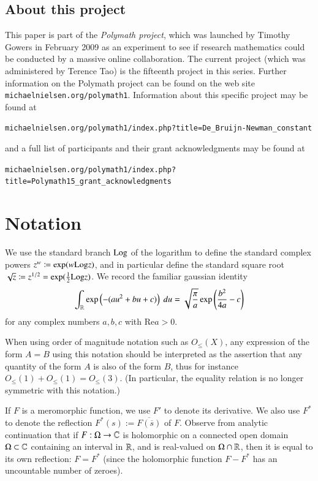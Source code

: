 \subsection{About this project}

This paper is part of the \emph{Polymath project}, which was launched
by Timothy Gowers in February 2009 as an experiment to see if research
mathematics could be conducted by a massive online collaboration.
The current project (which was administered by Terence Tao) is the fifteenth
project in this series.  Further information on the Polymath project can be
found on the web site {\tt michaelnielsen.org/polymath1}.  Information
about this specific project may be found at
\begin{center}
\small{{\tt michaelnielsen.org/polymath1/index.php?title=De\_Bruijn-Newman\_constant}}
\end{center}
and a full list of participants and their grant acknowledgments may be
found at
\begin{center}
\small{{\tt michaelnielsen.org/polymath1/index.php?title=Polymath15\_grant\_acknowledgments}}
\end{center}

\section{Notation}

We use the standard branch ${\operatorname{Log}}$ of the logarithm to define the standard complex powers $z^w \coloneqq \exp( w {\operatorname{Log}} z)$, and in particular define the standard square root $\sqrt{z} \coloneqq z^{1/2} = \exp( \frac{1}{2} {\operatorname{Log}} z)$.  We record the familiar gaussian identity
\begin{equation}\label{gaussian}
 \int_{\mathbb{R}} \exp\left(-(au^2+bu+c)\right)\ du = \sqrt{\frac{\pi}{a}} \exp\left( \frac{b^2}{4a} - c\right)
\end{equation}
for any complex numbers $a,b,c$ with $\mathrm{Re} a > 0$.

When using order of magnitude notation such as $O_{\leq}(X)$, any expression of the form $A=B$ using this notation should be interpreted as the assertion that any quantity of the form $A$ is also of the form $B$, thus for instance $O_{\leq}(1) + O_{\leq}(1) = O_{\leq}(3)$.  (In particular, the equality relation is no longer symmetric with this notation.)

If $F$ is a meromorphic function, we use $F'$ to denote its derivative.  We also use $F^*$ to denote the reflection $F^*(s) := \overline{F(\overline{s})}$ of $F$.  Observe from analytic continuation that if $F:\Omega \to \mathbb{C}$ is holomorphic on a connected open domain $\Omega \subset \mathbb{C}$ containing an interval in $\mathbb{R}$, and is real-valued on $\Omega \cap \mathbb{R}$, then it is equal to its own reflection: $F = F^*$ (since the holomorphic function $F - F^*$ has an uncountable number of zeroes).

